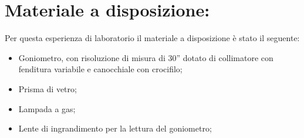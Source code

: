 \section{Materiale a disposizione:}

Per questa esperienza di laboratorio il materiale a disposizione è stato il seguente:
\begin{itemize}
	\item{Goniometro, con risoluzione di misura di 30'' dotato di collimatore con fenditura variabile e canocchiale con crocifilo;}
    \item{Prisma di vetro;}
	\item{Lampada a gas;}
	\item{Lente di ingrandimento per la lettura del goniometro;}
\end{itemize}
